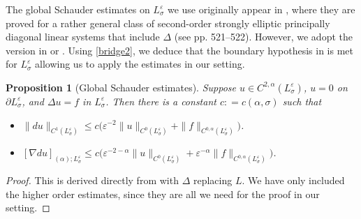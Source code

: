 \documentclass[11pt]{amsart}
\newtheorem{proposition}{Proposition}
\theoremstyle{definition}
\theoremstyle{remark}
\begin{document}
The global Schauder estimates on $L_\sigma^\varepsilon$ we use originally appear in \cite[Lemma 1 \& 2, p. 522]{Sm87}, where they are proved for a rather general class of second-order strongly elliptic principally diagonal linear systems that include $\Delta$ (see pp. 521--522). However, we adopt the version in \cite{Sm89} or \cite{Sm93}. Using \eqref{bridge2}, we deduce that the boundary hypothesis in \cite[(f), p. 521]{Sm87} is met for $L_\sigma^\varepsilon$ allowing us to apply the estimates in our setting. 
\begin{proposition}[Global Schauder estimates]\label{prop: globalschauder}
    Suppose $u \in C^{2,\alpha}(L_\sigma^\varepsilon)$, $u = 0$ on $\partial L_\sigma^\varepsilon$, and $\Delta u = f$ in $L_\sigma^\varepsilon$. Then there is a constant $c: = c(\alpha,\sigma)$ such that 
    \begin{itemize}
        \item[(a)] $\| du\|_{C^{1}(L_\sigma^\varepsilon)} \leq c\big(\varepsilon^{-2}\|u\|_{C^0(L_\sigma^\varepsilon)} +  \|f\|_{C^{0,\alpha}(L_\sigma^\varepsilon)} \big)$.
        \item[(b)] $[\nabla du]_{(\alpha); L_\sigma^\varepsilon} \leq c\big(\varepsilon^{-2-\alpha}\|u\|_{C^0(L_\sigma^\varepsilon)} + \varepsilon^{ - \alpha}\|f\|_{C^{0,\alpha}(L_\sigma^\varepsilon)}\big)$.
    \end{itemize}
\end{proposition}
\begin{proof}
    This is derived directly from \cite[Proposition 3.3]{Sm89} with $\Delta$ replacing $L$. We have only included the higher order estimates, since they are all we need for the proof in our setting.
\end{proof}
\end{document}
